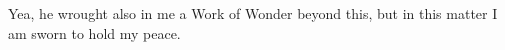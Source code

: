 Yea, he wrought also in me a Work of Wonder beyond this, but in this matter I am sworn to hold my peace.

%
%
%
%
%
%
%
%
%
%
%
%
%
%
%
%
%
%
%
%
%
%
%
